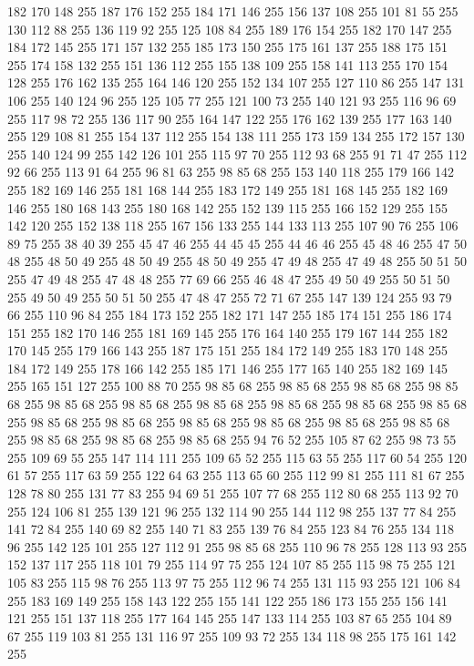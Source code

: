 182 170 148 255 187 176 152 255 184 171 146 255 156 137 108 255 101 81 55 255 130 112 88 255 136 119 92 255 125 108 84 255 189 176 154 255 182 170 147 255 184 172 145 255 171 157 132 255 185 173 150 255 175 161 137 255 188 175 151 255 174 158 132 255 151 136 112 255 155 138 109 255 158 141 113 255 170 154 128 255 176 162 135 255 164 146 120 255 152 134 107 255 127 110 86 255 147 131 106 255 140 124 96 255 125 105 77 255 121 100 73 255 140 121 93 255 116 96 69 255 117 98 72 255 136 117 90 255 164 147 122 255 176 162 139 255 177 163 140 255 129 108 81 255 154 137 112 255 154 138 111 255 173 159 134 255 172 157 130 255 140 124 99 255 142 126 101 255 115 97 70 255 112 93 68 255 91 71 47 255 112 92 66 255 113 91 64 255 96 81 63 255 98 85 68 255 153 140 118 255 179 166 142 255 182 169 146 255 181 168 144 255 183 172 149 255 181 168 145 255 182 169 146 255 180 168 143 255 180 168 142 255 152 139 115 255 166 152 129 255 155 142 120 255 152 138 118 255 167 156 133 255 144 133 113 255
107 90 76 255 106 89 75 255 38 40 39 255 45 47 46 255 44 45 45 255 44 46 46 255 45 48 46 255 47 50 48 255 48 50 49 255 48 50 49 255 48 50 49 255 47 49 48 255 47 49 48 255 50 51 50 255 47 49 48 255 47 48 48 255 77 69 66 255 46 48 47 255 49 50 49 255 50 51 50 255 49 50 49 255 50 51 50 255 47 48 47 255 72 71 67 255 147 139 124 255 93 79 66 255 110 96 84 255 184 173 152 255 182 171 147 255 185 174 151 255 186 174 151 255 182 170 146 255 181 169 145 255 176 164 140 255 179 167 144 255 182 170 145 255 179 166 143 255 187 175 151 255 184 172 149 255 183 170 148 255 184 172 149 255 178 166 142 255 185 171 146 255 177 165 140 255 182 169 145 255 165 151 127 255 100 88 70 255 98 85 68 255 98 85 68 255 98 85 68 255 98 85 68 255 98 85 68 255 98 85 68 255 98 85 68 255 98 85 68 255 98 85 68 255 98 85 68 255 98 85 68 255 98 85 68 255 98 85 68 255 98 85 68 255 98 85 68 255 98 85 68 255 98 85 68 255
98 85 68 255 98 85 68 255 94 76 52 255 105 87 62 255 98 73 55 255 109 69 55 255 147 114 111 255 109 65 52 255 115 63 55 255 117 60 54 255 120 61 57 255 117 63 59 255 122 64 63 255 113 65 60 255 112 99 81 255 111 81 67 255 128 78 80 255 131 77 83 255 94 69 51 255 107 77 68 255 112 80 68 255 113 92 70 255 124 106 81 255 139 121 96 255 132 114 90 255 144 112 98 255 137 77 84 255 141 72 84 255 140 69 82 255 140 71 83 255 139 76 84 255 123 84 76 255 134 118 96 255 142 125 101 255 127 112 91 255 98 85 68 255 110 96 78 255 128 113 93 255 152 137 117 255 118 101 79 255 114 97 75 255 124 107 85 255 115 98 75 255 121 105 83 255 115 98 76 255 113 97 75 255 112 96 74 255 131 115 93 255 121 106 84 255 183 169 149 255 158 143 122 255 155 141 122 255 186 173 155 255 156 141 121 255 151 137 118 255 177 164 145 255 147 133 114 255 103 87 65 255 104 89 67 255 119 103 81 255 131 116 97 255 109 93 72 255 134 118 98 255 175 161 142 255
